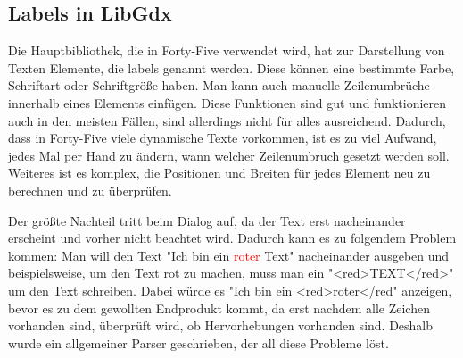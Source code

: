
\renewcommand{\kapitelautor}{Autor: Felix Zwickelstorfer}
\subsection{Labels in LibGdx}\label{subsec:labels-in-gdx}
\renewcommand{\kapitelautor}{Autor: Felix Zwickelstorfer}

Die Hauptbibliothek, die in Forty-Five verwendet wird, hat zur Darstellung von Texten Elemente, die labels genannt werden.
Diese können eine bestimmte Farbe, Schriftart oder Schriftgröße haben.
Man kann auch manuelle Zeilenumbrüche innerhalb eines Elements einfügen.
Diese Funktionen sind gut und funktionieren auch in den meisten Fällen, sind allerdings nicht für alles ausreichend.
Dadurch, dass in Forty-Five viele dynamische Texte vorkommen, ist es zu viel Aufwand, jedes Mal per Hand zu ändern, wann welcher Zeilenumbruch gesetzt werden soll.
Weiteres ist es komplex, die Positionen und Breiten für jedes Element neu zu berechnen und zu überprüfen.

Der größte Nachteil tritt beim Dialog auf, da der Text erst nacheinander erscheint und vorher nicht beachtet wird.
Dadurch kann es zu folgendem Problem kommen:
Man will den Text "Ich bin ein \textcolor{red}{roter} Text" nacheinander ausgeben und beispielsweise, um den Text rot zu machen, muss man ein "<red>TEXT</red>" um den Text schreiben.
Dabei würde es "Ich bin ein <red>roter</red" anzeigen, bevor es zu dem gewollten Endprodukt kommt, da erst nachdem alle Zeichen vorhanden sind, überprüft wird, ob Hervorhebungen vorhanden sind.
Deshalb wurde ein allgemeiner Parser geschrieben, der all diese Probleme löst.